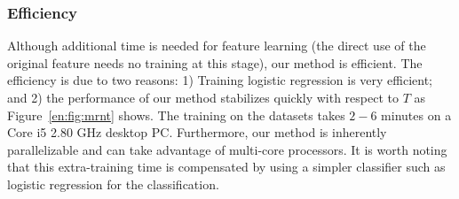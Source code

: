  \subsubsection{Efficiency}
 Although additional time is needed for feature learning (the direct use of
 the original feature needs no training at this stage), our method is efficient. The efficiency is due to two reasons: 1) Training
 logistic regression is very efficient; and 2) the performance of our
 method stabilizes quickly with respect to $T$ as Figure~\ref{en:fig:mrnt}
 shows. The training on the datasets takes $2-6$ minutes on a Core i5
 2.80 GHz desktop PC. Furthermore, our method is inherently
 parallelizable and can take advantage of multi-core processors. It is
 worth noting that this extra-training time is compensated by using a
 simpler classifier such as logistic regression for the
 classification.



